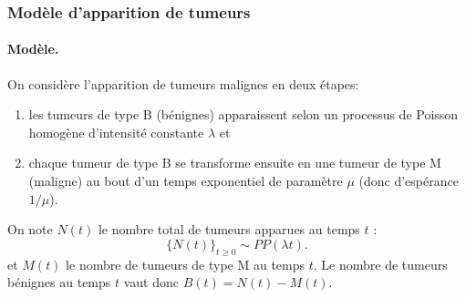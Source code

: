\subsubsection{Modèle d'apparition de tumeurs}


\paragraph{Modèle.}
On considère l'apparition de tumeurs malignes en deux étapes:
\begin{enumerate}[($i$)]
  \item les tumeurs de type B (bénignes) apparaissent selon un processus de Poisson homogène d'intensité constante $\lambda$ et
  \item chaque tumeur de type B se transforme ensuite en une tumeur de type M (maligne) au bout d'un temps exponentiel de paramètre $\mu$ (donc d'espérance $1/\mu$).
\end{enumerate}

On note $N(t)$ le nombre total de tumeurs apparues au temps $t$ : 
$$
\{N(t)\}_{t \geq 0} \sim PP(\lambda t).
$$
et $M(t)$ le nombre de tumeurs de type M au temps $t$. Le nombre de tumeurs bénignes au temps $t$ vaut donc $B(t) = N(t) - M(t)$.

\bigskip
